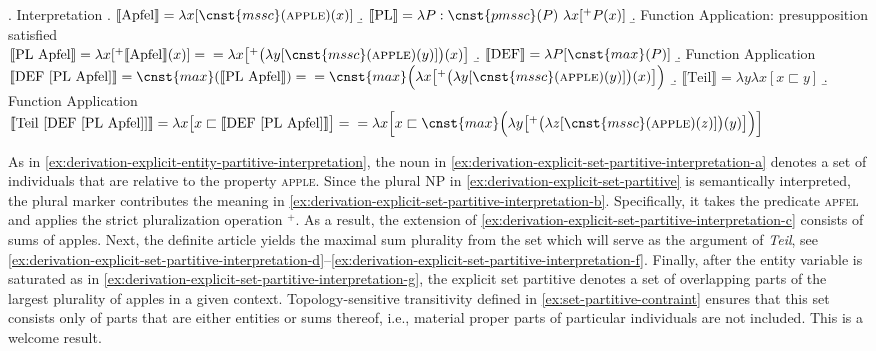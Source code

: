 	\ex. Interpretation\label{ex:derivation-explicit-set-partitive-interpretation}
	\a. $\llbracket \text{Apfel}\rrbracket = \lambda x [\cnst{mssc}(\textsc{apple})(x)]$\label{ex:derivation-explicit-set-partitive-interpretation-a}
	\b. $\llbracket \text{PL}\rrbracket = \lambda P : \cnst{pmssc}(P)\ \lambda x[{}^+P(x)]$\label{ex:derivation-explicit-set-partitive-interpretation-b}
	\b. Function Application: presupposition satisfied\\
	$\llbracket \text{PL Apfel}\rrbracket = \lambda x[{}^+\llbracket \text{Apfel}\rrbracket(x)] = \\
	= \lambda x\big[{}^+\big(\lambda y[\cnst{mssc}(\textsc{apple})(y)]\big)(x)\big]$\label{ex:derivation-explicit-set-partitive-interpretation-c}
	\b. $\llbracket \text{DEF}\rrbracket = \lambda P [\cnst{max}(P)]$\label{ex:derivation-explicit-set-partitive-interpretation-d}
	\b. Function Application\\
	$\llbracket \text{DEF [PL Apfel]}\rrbracket = \cnst{max}(\llbracket \text{PL Apfel}\rrbracket) = \\
	= \cnst{max}\Big(\lambda x\big[{}^+\big(\lambda y[\cnst{mssc}(\textsc{apple})(y)]\big)(x)\big]\Big)$\label{ex:derivation-explicit-set-partitive-interpretation-e}
	\b. $\llbracket \text{Teil}\rrbracket = \lambda y \lambda x [x \sqsubset y]$\label{ex:derivation-explicit-set-partitive-interpretation-f}
	\b. Function Application\\
	$\llbracket \text{Teil [DEF [PL Apfel]]}\rrbracket = \lambda x \big[x \sqsubset \llbracket \text{DEF [PL Apfel]}\rrbracket\big] = 
	\\= \lambda x \Big[x \sqsubset \cnst{max}\Big(\lambda y\big[{}^+\big(\lambda z[\cnst{mssc}(\textsc{apple})(z)]\big)(y)\big]\Big)\Big]$\label{ex:derivation-explicit-set-partitive-interpretation-g}

	As in \ref{ex:derivation-explicit-entity-partitive-interpretation}, the noun in \ref{ex:derivation-explicit-set-partitive-interpretation-a} denotes a set of individuals that are  relative to the property \textsc{apple}. Since the plural NP in \ref{ex:derivation-explicit-set-partitive} is semantically interpreted, the plural marker contributes the meaning in \ref{ex:derivation-explicit-set-partitive-interpretation-b}. Specifically, it takes the predicate \textsc{apfel} and applies the strict pluralization operation ${}^+$. As a result, the extension of \ref{ex:derivation-explicit-set-partitive-interpretation-c} consists of sums of apples. Next, the definite article yields the maximal sum plurality from the set which will serve as the argument of \textit{Teil}, see \ref{ex:derivation-explicit-set-partitive-interpretation-d}--\ref{ex:derivation-explicit-set-partitive-interpretation-f}. Finally, after the entity variable is saturated as in \ref{ex:derivation-explicit-set-partitive-interpretation-g}, the explicit set partitive denotes a set of overlapping parts of the largest plurality of apples in a given context. Topology-sensitive transitivity defined in \ref{ex:set-partitive-contraint} ensures that this set consists only of parts that are either  entities or sums thereof, i.e., material proper parts of particular individuals are not included. This is a welcome result.

